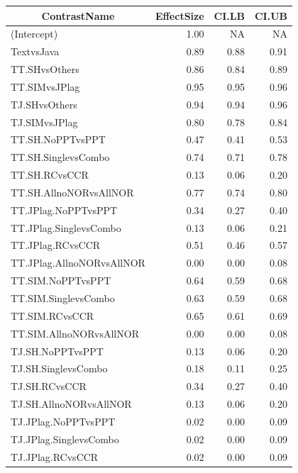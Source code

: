 \documentclass[a4paper, 12pt, oneside, openany, final, pdftex]{book}\usepackage[]{graphicx}\usepackage[]{color}
\begin{document}
\begin{appendices}
\begin{table}
\begin{threeparttable}
\begin{tabular}{lrrr}
\toprule
\multicolumn{1}{c}{\textbf{ContrastName}} & \multicolumn{1}{c}{\textbf{EffectSize}} & \multicolumn{1}{c}{\textbf{CI.LB}} & \multicolumn{1}{c}{\textbf{CI.UB}}\\
\midrule
\rowcolor{gray!6}  (Intercept) & 1.00 & NA & NA\\
TextvsJava & 0.89 & 0.88 & 0.91\\
\rowcolor{gray!6}  TT.SHvsOthers & 0.86 & 0.84 & 0.89\\
TT.SIMvsJPlag & 0.95 & 0.95 & 0.96\\
\rowcolor{gray!6}  TJ.SHvsOthers & 0.94 & 0.94 & 0.96\\
TJ.SIMvsJPlag & 0.80 & 0.78 & 0.84\\
\hline
\rowcolor{gray!6}  TT.SH.NoPPTvsPPT & 0.47 & 0.41 & 0.53\\
TT.SH.SinglevsCombo & 0.74 & 0.71 & 0.78\\
\rowcolor{gray!6}  TT.SH.RCvsCCR & 0.13 & 0.06 & 0.20\\
TT.SH.AllnoNORvsAllNOR & 0.77 & 0.74 & 0.80\\
\rowcolor{gray!6}  TT.JPlag.NoPPTvsPPT & 0.34 & 0.27 & 0.40\\
TT.JPlag.SinglevsCombo & 0.13 & 0.06 & 0.21\\
\rowcolor{gray!6}  TT.JPlag.RCvsCCR & 0.51 & 0.46 & 0.57\\
TT.JPlag.AllnoNORvsAllNOR & 0.00 & 0.00 & 0.08\\
\rowcolor{gray!6}  TT.SIM.NoPPTvsPPT & 0.64 & 0.59 & 0.68\\
TT.SIM.SinglevsCombo & 0.63 & 0.59 & 0.68\\
\rowcolor{gray!6}  TT.SIM.RCvsCCR & 0.65 & 0.61 & 0.69\\
TT.SIM.AllnoNORvsAllNOR & 0.00 & 0.00 & 0.08\\
\rowcolor{gray!6}  TJ.SH.NoPPTvsPPT & 0.13 & 0.06 & 0.20\\
TJ.SH.SinglevsCombo & 0.18 & 0.11 & 0.25\\
\rowcolor{gray!6}  TJ.SH.RCvsCCR & 0.34 & 0.27 & 0.40\\
TJ.SH.AllnoNORvsAllNOR & 0.13 & 0.06 & 0.20\\
\rowcolor{gray!6}  TJ.JPlag.NoPPTvsPPT & 0.02 & 0.00 & 0.09\\
TJ.JPlag.SinglevsCombo & 0.02 & 0.00 & 0.09\\
\rowcolor{gray!6}  TJ.JPlag.RCvsCCR & 0.02 & 0.00 & 0.09\\

\end{tabular}
\end{threeparttable}
\end{table}
\end{appendices}
\end{document}
